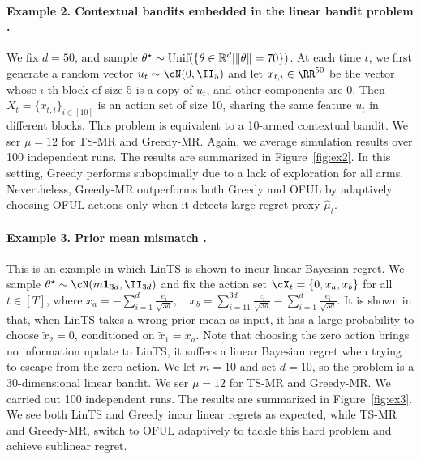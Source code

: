 \paragraph{Example 2. Contextual bandits embedded in the linear bandit problem  \citep{abbasi2013online}.} We fix $d = 50$, and sample $\theta^\star\sim\text{Unif}(\{\theta \in \mathbb{R}^d|\|\theta\|= 70\}) $. At each time $t$, we first  generate a random vector $u_t \sim \cN(0, \II_5)$ and let $x_{t,i}\in \RR^{50}$ be the vector whose $i$-th block of size 5 is a  copy of $u_t$, and other components are 0. Then $X_t = \{x_{t,i}\}_{i\in [10] }$ is an action set of size 10, sharing the same feature $u_t$ in different blocks. This problem is equivalent to a 10-armed contextual bandit. We ser $\mu = 12$ for TS-MR and Greedy-MR. Again, we average simulation results over 100 independent runs. The results are summarized in Figure~\ref{fig:ex2}. In this setting, Greedy performs suboptimally due to a lack of exploration for all arms. Nevertheless, Greedy-MR outperforms both Greedy and OFUL by adaptively choosing OFUL actions only when it detects large regret proxy $\hat{\mu}_t$.  



\paragraph{Example 3. Prior mean mismatch \citep{hamidi2020frequentist}.} This is an example in which LinTS is shown to incur linear Bayesian regret. We sample $\theta^\star \sim \cN(m \mathbf{1}_{3d}, \II_{3d})$ and fix the action set $\cX_t = \{0, x_a, x_b\}$ for all $t\in[T]$, where $x_a = - \sum_{i=1}^{d} \frac{e_i}{\sqrt{3d}},  \quad x_b = \sum_{i=11}^{3d} \frac{e_i}{\sqrt{3d}}  - \sum_{i=1}^{d} \frac{e_i}{\sqrt{3d}}$.
It is shown in \cite{hamidi2020frequentist} that, when LinTS takes a wrong prior mean as input,  it has a large probability to choose  $\tilde{x}_2 = 0$, conditioned on $\tilde{x}_1 = x_a$. Note that choosing the zero action brings no information update to LinTS, it suffers a linear Bayesian regret when trying to escape from the zero action. We let $m = 10$ and set $d = 10$, so the problem is a $30$-dimensional linear bandit. We ser $\mu = 12$ for TS-MR and Greedy-MR. We carried out 100 independent runs. The results are summarized in Figure~\ref{fig:ex3}. We see both LinTS and Greedy incur linear regrets as expected, while TS-MR and Greedy-MR, switch to OFUL adaptively to tackle this hard problem  and achieve sublinear regret.



